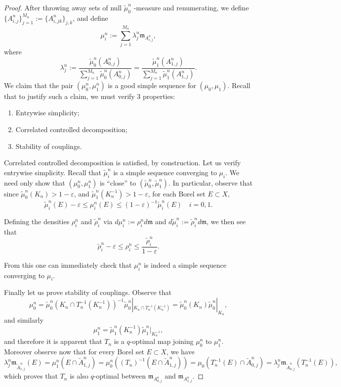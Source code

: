 \documentclass{article}
\renewcommand{\epsilon}{\varepsilon}
\newcommand{\m}{\mathfrak{m}}
\theoremstyle{definition}
\begin{document}
{\begin{proof}
After throwing away sets of null $\tilde\mu_0^n$ -measure and renumerating, we define $\{A_{i,j}^n\}_{j=1}^{M_n}:=\{A_{i,jk}^n\}_{j,k}$, and define 
\[ \mu_i^n:= \sum_{j=1}^{M_n}\lambda_{j}^n \m_{A_{i,j}^n},\]
where 
\[\lambda_{j}^n:= \frac{\tilde\mu_{0}^n( A_{0,j}^n)}{\sum_{j=1}^{M_n}\tilde\mu_{0}^n(A_{0,j}^n)}=\frac{\tilde\mu_{1}^n( A_{1,j}^n)}{\sum_{j=1}^{M_n}\tilde\mu_{1}^n( A_{1,j}^n)}.\]
We claim that the pair $(\mu_0^n,\mu_1^n)$ is a good simple sequence for $(\mu_0, \mu_1)$. Recall that to justify such a claim, we must verify 3 properties: 
\begin{enumerate}
\item Entrywise simplicity;
\item Correlated controlled decomposition;
\item Stability of couplings.
\end{enumerate}

Correlated controlled decomposition is satisfied, by construction. Let us verify entrywise simplicity. Recall that $\tilde\mu_i^n$ is a simple sequence converging to $\mu_i$. We need only show that $(\mu_0^n,\mu_1^n)$ is ``close'' to $(\tilde \mu_0^n,\tilde\mu_1^n)$. In particular, observe that since $\tilde\mu_0^n(K_n)>1-\epsilon$, and $\tilde \mu_1^n(K_n^{-1})>1-\epsilon$, for each Borel set $E\subset X$, 
\[\tilde\mu_i^n(E)-\epsilon\leq\mu_i^n(E)\leq (1-\epsilon)^{-1} \tilde\mu_i^n(E)\quad i=0,1.\]

Defining the densities $\rho_i^n$ and $\tilde \rho_i^n$ via $d\mu_i^n:=\rho_i^nd\m$ and $d\tilde\mu_i^n:=\tilde\rho_i^nd\m$, we then see that 
\[\tilde \rho_i^n-\epsilon\leq \rho_i^n\leq \frac{\tilde\rho_i^n}{1-\epsilon}.\]

From this one can immediately check that $\mu_i^n$ is indeed a simple sequence converging to $\mu_i$.

Finally let us prove stability of couplings. Observe that 
\[\mu_0^n= \tilde\mu_0^n(K_n\cap T_n^{-1}(K_n^{-1}))^{-1}\tilde \mu_0^n|_{K_n\cap T_n^{-1}(K_n^{-1})}= \tilde\mu_0^n(K_n)\tilde\mu_0^n|_{K_n},\]
and similarly
\[\mu_1^n= \tilde\mu_1^n(K_n^{-1})\tilde \mu_1^n|_{K_n^{-1}},\]
and therefore it is apparent that $T_n$ is a $q$-optimal map joining $\mu_0^n$ to $\mu_1^n$. 
Moreover observe now that for every Borel set $E\subset X$, we have 
\[\lambda_j^n\m_{\tilde A_{1,j}^n}(E)= \mu_1^n(E\cap \tilde A_{1,j}^n)=\mu_0^n((T_n)^{-1}(E\cap \tilde A_{1,j}^n))=\mu_0(T_n^{-1}(E)\cap \tilde A_{0,j}^n)= \lambda_j^n \m_{\tilde A_{0,j}^n}(T_n^{-1}(E)),\]
which proves that $T_n$ is also $q$-optimal between $\m_{A_{0,j}^n}$ and $\m_{A_{1,j}^n}$. 


\end{proof}}
\end{document}
